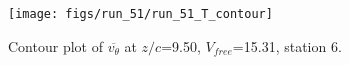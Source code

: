 \begin{figure}[H]
\centering
\texttt{[image: figs/run\_51/run\_51\_T\_contour]}
\caption{Contour plot of $\overline{v_{\theta}}$ at $z/c$=9.50, $V_{free}$=15.31, station 6.}
\label{fig:run_51_T_contour}
\end{figure}


